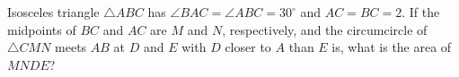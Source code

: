Isosceles triangle $\triangle{ABC}$ has $\angle{BAC}=\angle{ABC}=30^\circ$ and $AC=BC=2$. If the midpoints of $BC$ and $AC$ are $M$ and $N$, respectively, and the circumcircle of $\triangle{CMN}$ meets $AB$ at $D$ and $E$ with $D$ closer to $A$ than $E$ is, what is the area of $MNDE$?